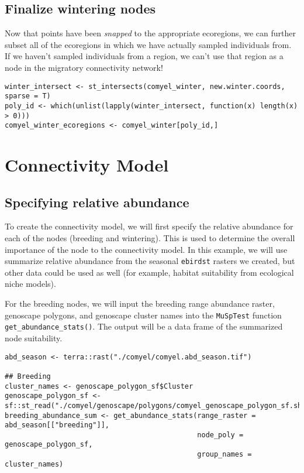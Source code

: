 \documentclass[
]{book}
\begin{document}
\hypertarget{finalize-wintering-nodes}{%
\section{Finalize wintering nodes}\label{finalize-wintering-nodes}}

Now that points have been \emph{snapped} to the appropriate ecoregions, we can further subset all of the ecoregions in which we have actually sampled individuals from. If we haven't sampled individuals from a region, we can't use that region as a node in the migratory connectivity network!

\begin{verbatim}
winter_intersect <- st_intersects(comyel_winter, new.winter.coords, sparse = T)
poly_id <- which(unlist(lapply(winter_intersect, function(x) length(x) > 0)))
comyel_winter_ecoregions <- comyel_winter[poly_id,]
\end{verbatim}

\hypertarget{connectivity}{%
\chapter{Connectivity Model}\label{connectivity}}

\hypertarget{specifying-relative-abundance}{%
\section{Specifying relative abundance}\label{specifying-relative-abundance}}

To create the connectivity model, we will first specify the relative abundance for each of the nodes (breeding and wintering). This is used to determine the overall importance of the node to the connectivity model. In this example, we will use summarize relative abundance from the seasonal \texttt{ebirdst} rasters we created, but other data could be used as well (for example, habitat suitability from ecological niche models).

For the breeding nodes, we will input the breeding range abundance raster, genoscape polygons, and genoscape cluster names into the \texttt{MuSpTest} function \texttt{get\_abundance\_stats()}. The output will be a data frame of the summarized node suitability.

\begin{verbatim}
abd_season <- terra::rast("./comyel/comyel.abd_season.tif")

## Breeding
cluster_names <- genoscape_polygon_sf$Cluster
genoscape_polygon_sf <- sf::st_read("./comyel/genoscape/polygons/comyel_genoscape_polygon_sf.shp")
breeding_abundance_sum <- get_abundance_stats(range_raster = abd_season[["breeding"]],
                                              node_poly = genoscape_polygon_sf,
                                              group_names = cluster_names)
\end{verbatim}
\end{document}
